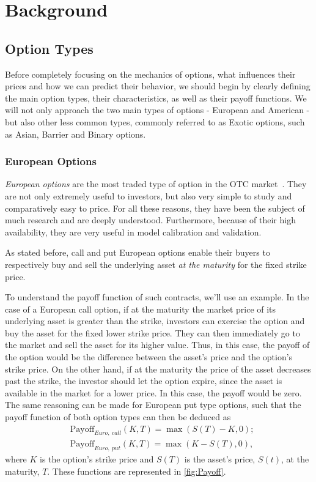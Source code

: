 \chapter{Background}
\label{chapter:background}
\section{Option Types}
Before completely focusing on the mechanics of options, what influences their prices and how we can predict their behavior, we should begin by clearly defining the main option types, their characteristics, as well as their payoff functions. We will not only approach the two main types of options - European and American - but also other less common types, commonly referred to as Exotic options, such as Asian, Barrier and Binary options.



\subsection{European Options}
\emph{European options} are the most traded type of option in the OTC market~\cite{InvEuro}. They are not only extremely useful to investors, but also very simple to study and comparatively easy to price. For all these reasons, they have been the subject of much research and are deeply understood. Furthermore, because of their high availability, they are very useful in model calibration and validation.


As stated before, call and put European options enable their buyers to respectively buy and sell the underlying asset \emph{at the maturity} for the fixed strike price.

To understand the payoff function of such contracts, we'll use an example. In the case of a European call option, if at the maturity the market price of its underlying asset is greater than the strike, investors can exercise the option and buy the asset for the fixed lower strike price. They can then immediately go to the market and sell the asset for its higher value. Thus, in this case, the payoff of the option would be the difference between the asset's price and the option's strike price. On the other hand, if at the maturity the price of the asset decreases past the strike, the investor should let the option expire, since the asset is available in the market for a lower price. In this case, the payoff would be zero.
The same reasoning can be made for European put type options, such that the payoff function of both option types can then be deduced as
\begin{equation}\label{callput}
\begin{split}
&\text{Payoff}_{Euro,\ call}(K,T)=\max\left(S(T)-K,0\right);\\
&\text{Payoff}_{Euro,\ put}(K,T)=\max\left(K-S(T),0\right),
\end{split}
\end{equation}
\noindent where $K$ is the option's strike price and $S(T)$ is the asset's price, $S(t)$, at the maturity, $T$. These functions are represented in \autoref{fig:Payoff}.

